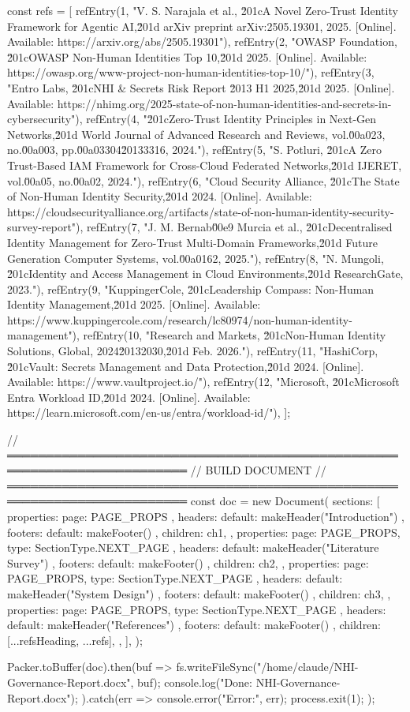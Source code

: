 const refs = [
  refEntry(1, "V. S. Narajala et al., \u201cA Novel Zero-Trust Identity Framework for Agentic AI,\u201d arXiv preprint arXiv:2505.19301, 2025. [Online]. Available: https://arxiv.org/abs/2505.19301"),
  refEntry(2, "OWASP Foundation, \u201cOWASP Non-Human Identities Top 10,\u201d 2025. [Online]. Available: https://owasp.org/www-project-non-human-identities-top-10/"),
  refEntry(3, "Entro Labs, \u201cNHI & Secrets Risk Report \u2013 H1 2025,\u201d 2025. [Online]. Available: https://nhimg.org/2025-state-of-non-human-identities-and-secrets-in-cybersecurity"),
  refEntry(4, "\u201cZero-Trust Identity Principles in Next-Gen Networks,\u201d World Journal of Advanced Research and Reviews, vol.\u00a023, no.\u00a003, pp.\u00a03304\u20133316, 2024."),
  refEntry(5, "S. Potluri, \u201cA Zero Trust-Based IAM Framework for Cross-Cloud Federated Networks,\u201d IJERET, vol.\u00a05, no.\u00a02, 2024."),
  refEntry(6, "Cloud Security Alliance, \u201cThe State of Non-Human Identity Security,\u201d 2024. [Online]. Available: https://cloudsecurityalliance.org/artifacts/state-of-non-human-identity-security-survey-report"),
  refEntry(7, "J. M. Bernab\u00e9 Murcia et al., \u201cDecentralised Identity Management for Zero-Trust Multi-Domain Frameworks,\u201d Future Generation Computer Systems, vol.\u00a0162, 2025."),
  refEntry(8, "N. Mungoli, \u201cIdentity and Access Management in Cloud Environments,\u201d ResearchGate, 2023."),
  refEntry(9, "KuppingerCole, \u201cLeadership Compass: Non-Human Identity Management,\u201d 2025. [Online]. Available: https://www.kuppingercole.com/research/lc80974/non-human-identity-management"),
  refEntry(10, "Research and Markets, \u201cNon-Human Identity Solutions, Global, 2024\u20132030,\u201d Feb. 2026."),
  refEntry(11, "HashiCorp, \u201cVault: Secrets Management and Data Protection,\u201d 2024. [Online]. Available: https://www.vaultproject.io/"),
  refEntry(12, "Microsoft, \u201cMicrosoft Entra Workload ID,\u201d 2024. [Online]. Available: https://learn.microsoft.com/en-us/entra/workload-id/"),
];

// ═════════════════════════════════════════════════════════════════════════
//  BUILD DOCUMENT
// ═════════════════════════════════════════════════════════════════════════
const doc = new Document({
  sections: [
    {
      properties: { page: PAGE_PROPS },
      headers:    { default: makeHeader("Introduction") },
      footers:    { default: makeFooter() },
      children:   ch1,
    },
    {
      properties: { page: PAGE_PROPS, type: SectionType.NEXT_PAGE },
      headers:    { default: makeHeader("Literature Survey") },
      footers:    { default: makeFooter() },
      children:   ch2,
    },
    {
      properties: { page: PAGE_PROPS, type: SectionType.NEXT_PAGE },
      headers:    { default: makeHeader("System Design") },
      footers:    { default: makeFooter() },
      children:   ch3,
    },
    {
      properties: { page: PAGE_PROPS, type: SectionType.NEXT_PAGE },
      headers:    { default: makeHeader("References") },
      footers:    { default: makeFooter() },
      children:   [...refsHeading, ...refs],
    },
  ],
});

Packer.toBuffer(doc).then(buf => {
  fs.writeFileSync("/home/claude/NHI-Governance-Report.docx", buf);
  console.log("Done: NHI-Governance-Report.docx");
}).catch(err => {
  console.error("Error:", err);
  process.exit(1);
});
